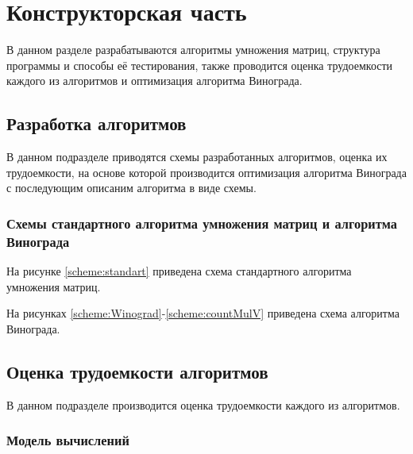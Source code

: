 \chapter{Конструкторская часть}

В данном разделе разрабатываются алгоритмы умножения матриц, структура
программы и способы её тестирования, также проводится оценка трудоемкости
каждого из алгоритмов и оптимизация алгоритма Винограда.

\section{Разработка алгоритмов}

В данном подразделе приводятся схемы разработанных алгоритмов, оценка их
трудоемкости, на основе которой производится оптимизация алгоритма Винограда с
последующим описаним алгоритма в виде схемы.

\subsection{Схемы стандартного алгоритма умножения матриц и алгоритма
            Винограда}

На рисунке \ref{scheme:standart} приведена схема стандартного алгоритма
умножения матриц.

\noindent
{}

На рисунках \ref{scheme:Winograd}-\ref{scheme:countMulV} приведена схема
алгоритма Винограда.

\noindent
{}
\noindent
{}
\noindent
{}

\section{Оценка трудоемкости алгоритмов}

В данном подразделе производится оценка трудоемкости каждого из алгоритмов.

\subsection{Модель вычислений}

